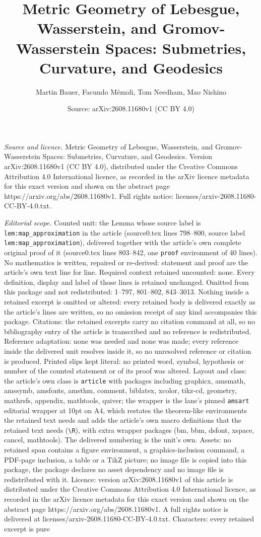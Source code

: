 \documentclass[10pt,a4paper]{amsart}
\title[Metric Geometry of Lebesgue, Wasserstein, and Gromov-Wassers]{Metric Geometry of Lebesgue, Wasserstein, and Gromov-Wasserstein Spaces: Submetries, Curvature, and Geodesics}
\author{Martin Bauer, Facundo M\'emoli, Tom Needham, Mao Nishino}
\date{Source: arXiv:2608.11680v1 (CC BY 4.0)}
\begin{document}
\maketitle

\noindent\emph{Source and licence.} Metric Geometry of Lebesgue, Wasserstein, and Gromov-Wasserstein Spaces: Submetries, Curvature, and Geodesics. Version arXiv:2608.11680v1 (CC BY 4.0), distributed under the Creative Commons Attribution 4.0 International licence, as recorded in the arXiv licence metadata for this exact version and shown on the abstract page https://arxiv.org/abs/2608.11680v1. Full rights notice: licenses/arxiv-2608.11680-CC-BY-4.0.txt.\par\smallskip

\noindent\textit{Editorial scope.} Counted unit: the Lemma whose source label is \texttt{lem:map\_approximation} in the article (source0.tex lines 798--800, source label \texttt{lem:map\_approximation}), delivered together with the article's own complete original proof of it (source0.tex lines 803--842, one \texttt{proof} environment of 40 lines). No mathematics is written, repaired or re-derived: statement and proof are the article's own text line for line. Required context retained uncounted: none. Every definition, display and label of those lines is retained unchanged. Omitted from this package and not redistributed: 1--797, 801--802, 843--3013. Nothing inside a retained excerpt is omitted or altered: every retained body is delivered exactly as the article's lines are written, so no omission receipt of any kind accompanies this package. Citations: the retained excerpts carry no citation command at all, so no bibliography entry of the article is transcribed and no reference is redistributed. Reference adaptation: none was needed and none was made; every reference inside the delivered unit resolves inside it, so no unresolved reference or citation is produced. Printed slips kept literal: no printed word, symbol, hypothesis or number of the counted statement or of its proof was altered. Layout and class: the article's own class is \texttt{article} with packages including graphicx, amsmath, amssymb, amsfonts, amsthm, comment, biblatex, xcolor, tikz-cd, geometry, mathrsfs, appendix, mathtools, quiver; the wrapper is the lane's pinned \texttt{amsart} editorial wrapper at 10pt on A4, which restates the theorem-like environments the retained text needs and adds the article's own macro definitions that the retained text needs (\texttt{\textbackslash R}), with extra wrapper packages (bm, bbm, dsfont, xspace, cancel, mathtools). The delivered numbering is the unit's own. Assets: no retained span contains a figure environment, a graphics-inclusion command, a PDF-page inclusion, a table or a TikZ picture; no image file is copied into this package, the package declares no asset dependency and no image file is redistributed with it. Licence: version arXiv:2608.11680v1 of this article is distributed under the Creative Commons Attribution 4.0 International licence, as recorded in the arXiv licence metadata for this exact version and shown on the abstract page https://arxiv.org/abs/2608.11680v1. A full rights notice is delivered at licenses/arxiv-2608.11680-CC-BY-4.0.txt. Characters: every retained excerpt is pure 
\end{document}
